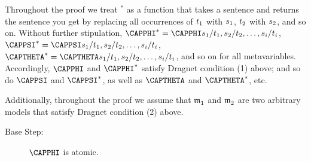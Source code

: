 \begin{PROOF} 
Throughout the proof we treat $^*$ as a function that takes a \GQL{} sentence and returns the sentence you get by replacing all occurrences of $t_1$ with $s_1$, $t_2$ with $s_2$, and so on. 
Without further stipulation, $\CAPPHI^*=\CAPPHI\variable{s}_1/\variable{t}_1,\variable{s}_2/\variable{t}_2,\ldots,\variable{s}_{\integer{i}}/\variable{t}_{\integer{i}}$, $\CAPPSI^*=\CAPPSI\variable{s}_1/\variable{t}_1,\variable{s}_2/\variable{t}_2,\ldots,\variable{s}_{\integer{i}}/\variable{t}_{\integer{i}}$, $\CAPTHETA^*=\CAPTHETA\variable{s}_1/\variable{t}_1,\variable{s}_2/\variable{t}_2,\ldots,\variable{s}_{\integer{i}}/\variable{t}_{\integer{i}}$, and so on for all metavariables.  Accordingly, $\CAPPHI$ and $\CAPPHI^*$ satisfy Dragnet condition (1) above; and so do $\CAPPSI$ and $\CAPPSI^*$, as well as $\CAPTHETA$ and $\CAPTHETA^*$, etc. 

Additionally, throughout the proof we assume that $\mathfrak{m^{\mathrm{}}_{\mathrm{1}}}$ and $\mathfrak{m^{\mathrm{}}_{\mathrm{2}}}$ are two arbitrary models that satisfy Dragnet condition (2) above.
\begin{description}
\item[Base Step:] $\CAPPHI$ is atomic.
\end{description}
\end{PROOF}
